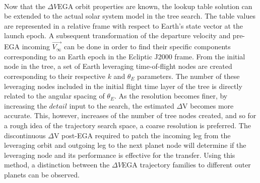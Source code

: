 \documentclass[letterpaper, paper,11pt]{./AAS}		%
\begin{document}
\\\indent Now that the $\Delta V$EGA orbit properties are known, the lookup table solution can be extended to the actual solar system model in the tree search. The table values are represented in a relative frame with respect to Earth's state vector at the launch epoch. A subsequent transformation of the departure velocity and pre-EGA incoming $\vec{V_\infty}$ can be done in order to find their specific components corresponding to an Earth epoch in the Ecliptic J2000 frame. From the initial node in the tree, a set of Earth leveraging time-of-flight nodes are created corresponding to their respective $k$ and $\theta_E$ parameters. The number of these leveraging nodes included in the initial flight time layer of the tree is directly related to the angular spacing of $\theta_E$. As the resolution becomes finer, by increasing the $\textit{detail}$ input to the search, the estimated $\Delta$V becomes more accurate. This, however, increases of the number of tree nodes created, and so for a rough idea of the trajectory search space, a coarse resolution is preferred. The discontinuous $\Delta$V post-EGA required to patch the incoming leg from the leveraging orbit and outgoing leg to the next planet node will determine if the leveraging node and its performance is effective for the transfer. Using this method, a distinction between the $\Delta V$EGA trajectory families to different outer planets can be observed.


\phantom{p. 1}
\clearpage
\end{document}
